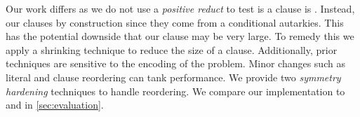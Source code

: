 Our work differs as we do not use a \emph{positive reduct} to test is a clause is \pr. Instead, our clauses \pr by construction since they come from a conditional autarkies. This has the potential downside that our clause may be very large. To remedy this we apply a shrinking technique to reduce the size of a clause. Additionally, prior techniques are sensitive to the encoding of the problem. Minor changes such as literal and clause reordering can tank performance. We provide two \emph{symmetry hardening} techniques to handle reordering. We compare our implementation \tool to \sadical and \prelearn in \autoref{sec:evaluation}.